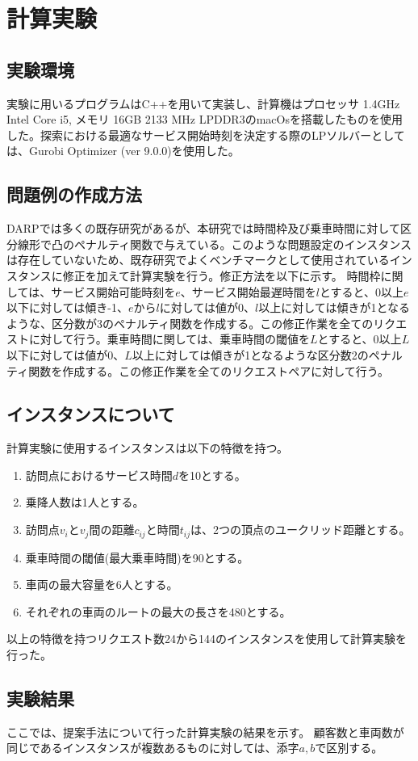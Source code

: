 \chapter{計算実験}\label{computational_result}
\section{実験環境}
実験に用いるプログラムはC++を用いて実装し、計算機はプロセッサ 1.4GHz Intel Core i5, メモリ 16GB 2133 MHz LPDDR3のmacOsを搭載したものを使用した。探索における最適なサービス開始時刻を決定する際のLPソルバーとしては、Gurobi Optimizer (ver 9.0.0)を使用した。

\section{問題例の作成方法}
DARPでは多くの既存研究があるが、本研究では時間枠及び乗車時間に対して区分線形で凸のペナルティ関数で与えている。このような問題設定のインスタンスは存在していないため、既存研究でよくベンチマークとして使用されているインスタンスに修正を加えて計算実験を行う。修正方法を以下に示す。
時間枠に関しては、サービス開始可能時刻を$e$、サービス開始最遅時間を$l$とすると、0以上$e$以下に対しては傾き-1、$e$から$l$に対しては値が0、$l$以上に対しては傾きが1となるような、区分数が3のペナルティ関数を作成する。この修正作業を全てのリクエストに対して行う。乗車時間に関しては、乗車時間の閾値を$L$とすると、0以上$L$以下に対しては値が0、$L$以上に対しては傾きが1となるような区分数2のペナルティ関数を作成する。この修正作業を全てのリクエストペアに対して行う。
\section{インスタンスについて}
計算実験に使用するインスタンスは以下の特徴を持つ。
\begin{enumerate}
 \item 訪問点におけるサービス時間$d$を10とする。
 \item 乗降人数は1人とする。
 \item 訪問点$v_i$と$v_j$間の距離$c_{ij}$と時間$t_{ij}$は、2つの頂点のユークリッド距離とする。
 \item 乗車時間の閾値(最大乗車時間)を90とする。
 \item 車両の最大容量を6人とする。
 \item それぞれの車両のルートの最大の長さを480とする。
\end{enumerate}
以上の特徴を持つリクエスト数24から144のインスタンスを使用して計算実験を行った。
\section{実験結果}
ここでは、提案手法について行った計算実験の結果を示す。
顧客数と車両数が同じであるインスタンスが複数あるものに対しては、添字$a,b$で区別する。
